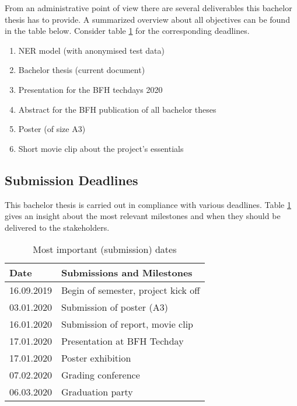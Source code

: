 From an administrative point of view there are several deliverables this bachelor thesis has to provide. A summarized overview about all objectives can be found in the table below. Consider table \ref{tbl:deadlines} for the corresponding deadlines.

\begin{enumerate}
    \item NER model (with anonymised test data)
    \item Bachelor thesis (current document)
    \item Presentation for the BFH techdays 2020
    \item Abstract for the BFH publication of all bachelor theses
    \item Poster (of size A3)
    \item Short movie clip about the project's essentials
\end{enumerate}

\subsection{Submission Deadlines}

This bachelor thesis is carried out in compliance with various deadlines. Table \ref{tbl:deadlines} gives an insight about the most relevant milestones and when they should be delivered to the stakeholders.

\begin{table}[ht!]
    \centering
    \begin{tabular}{|l|l|}
        \hline
        \textbf{Date} & \textbf{Submissions and Milestones} \\ [0.5ex]
        \hline
        16.09.2019 & Begin of semester, project kick off \\
        03.01.2020 & Submission of poster (A3) \\
        16.01.2020 & Submission of report, movie clip \\
        17.01.2020 & Presentation at BFH Techday \\
        17.01.2020 & Poster exhibition \\
        07.02.2020 & Grading conference \\
        06.03.2020 & Graduation party \\ [1ex]
        \hline
    \end{tabular}
    \caption{Most important (submission) dates}
    \label{tbl:deadlines}
\end{table}

